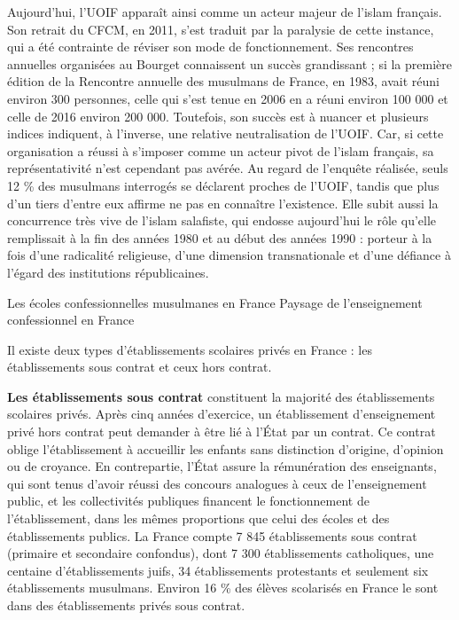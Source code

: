 Aujourd'hui, l'UOIF apparaît ainsi comme un acteur majeur de l'islam
français. Son retrait du CFCM, en 2011, s'est traduit par la paralysie
de cette instance, qui a été contrainte de réviser son mode de
fonctionnement. Ses rencontres annuelles organisées au Bourget
connaissent un succès grandissant ; si la première édition de la
Rencontre annuelle des musulmans de France, en 1983, avait réuni environ
300 personnes, celle qui s'est tenue en 2006 en a réuni environ 100 000
et celle de 2016 environ 200 000. Toutefois, son succès est à nuancer et
plusieurs indices indiquent, à l'inverse, une relative neutralisation de
l'UOIF. Car, si cette organisation a réussi à s'imposer comme un acteur
pivot de l'islam français, sa représentativité n'est cependant pas
avérée. Au regard de l'enquête réalisée, seuls 12 \% des musulmans
interrogés se déclarent proches de l'UOIF, tandis que plus d'un tiers
d'entre eux affirme ne pas en connaître l'existence. Elle subit aussi la
concurrence très vive de l'islam salafiste, qui endosse aujourd'hui le
rôle qu'elle remplissait à la fin des années 1980 et au début des années
1990 : porteur à la fois d'une radicalité religieuse, d'une dimension
transnationale et d'une défiance à l'égard des institutions
républicaines.


Les écoles confessionnelles musulmanes en France Paysage de
l'enseignement confessionnel en France


Il existe deux types d'établissements scolaires privés en France : les
établissements sous contrat et ceux hors contrat.

\textbf{Les établissements sous contrat} constituent la majorité des
établissements scolaires privés. Après cinq années d'exercice, un
établissement d'enseignement privé hors contrat peut demander à être lié
à l'État par un contrat. Ce contrat oblige l'établissement à accueillir
les enfants sans distinction d'origine, d'opinion ou de croyance. En
contrepartie, l'État assure la rémunération des enseignants, qui sont
tenus d'avoir réussi des concours analogues à ceux de l'enseignement
public, et les collectivités publiques financent le fonctionnement de
l'établissement, dans les mêmes proportions que celui des écoles et des
établissements publics. La France compte 7 845 établissements sous
contrat (primaire et secondaire confondus), dont 7 300 établissements
catholiques, une centaine d'établissements juifs, 34 établissements
protestants et seulement six établissements musulmans. Environ 16 \% des
élèves scolarisés en France le sont dans des établissements privés sous
contrat.

